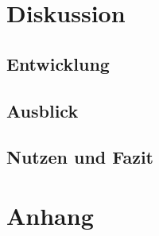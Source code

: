 \documentclass[a4paper,12pt,ngerman]{scrartcl}
\begin{document}
\newpage

\section{Diskussion}



\subsection{Entwicklung}

\subsection{Ausblick}

\subsection{Nutzen und Fazit}

\newpage

\section{Anhang}
\end{document}

